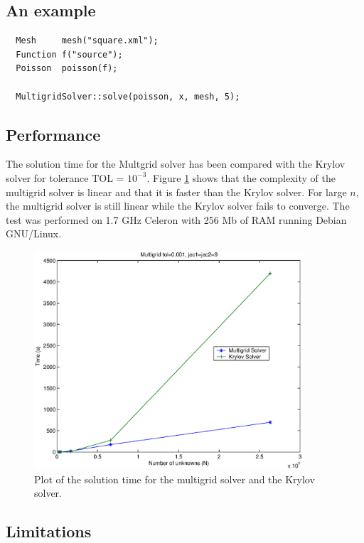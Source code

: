 \documentclass[12pt]{article}
\begin{document}
\subsection{An example}
\begin{verbatim}
  Mesh     mesh("square.xml");
  Function f("source");
  Poisson  poisson(f);

  MultigridSolver::solve(poisson, x, mesh, 5);
\end{verbatim}

\subsection{Performance}

The solution time for the Multgrid solver has been compared with the Krylov solver
for tolerance TOL = $10^{-3}$. Figure \ref{fig:multiPerformance}
shows that the complexity of the multigrid solver is linear and
that it is faster than the Krylov solver. For large $n$, the multigrid
solver is still linear while the Krylov solver fails to converge. The test
was performed on 1.7 GHz Celeron with 256 Mb of RAM running Debian GNU/Linux.

\begin{figure}[H]
  \begin{center}
    \includegraphics[width=10cm]{eps/multigrid.eps}
    \caption{Plot of the solution time for the multigrid solver and the Krylov solver.}
    \label{fig:multiPerformance}
  \end{center}
\end{figure}

\subsection{Limitations}
\end{document}
